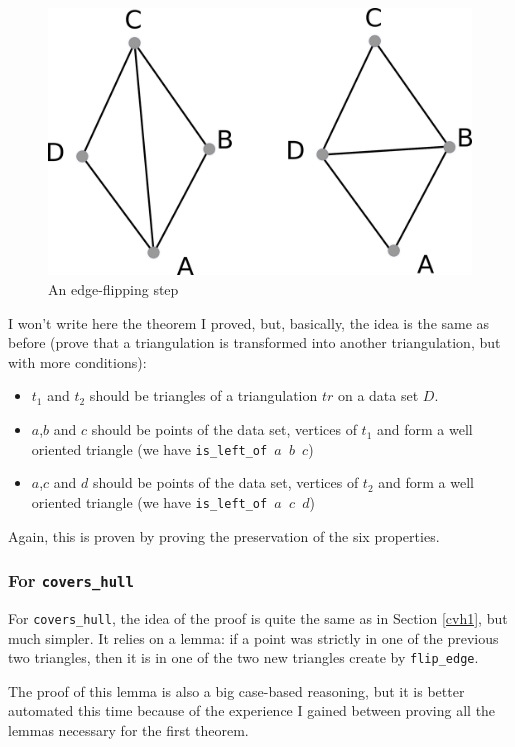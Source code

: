 \documentclass[a4paper,10pt]{article}
\begin{document}
\begin{figure}
  \centering
  \includegraphics[scale=2]{flip_edge}
    \caption{\label{flip_edge} An edge-flipping step}
\end{figure}

I won't write here the theorem I proved, but, basically, the idea is the same as before (prove that a triangulation is transformed into another triangulation, but with more conditions):
\begin{itemize}
\item $t_1$ and $t_2$ should be triangles of a triangulation $tr$ on a data set $D$.  
\item $a$,$b$ and $c$ should be points of the data set, vertices of $t_1$ and form a well oriented triangle (we have {\tt is\_left\_of $a$ $b$ $c$})
\item $a$,$c$ and $d$ should be points of the data set, vertices of $t_2$ and form a well oriented triangle (we have {\tt is\_left\_of $a$ $c$ $d$})
\end{itemize}
Again, this is proven by proving the preservation of the six properties.

\subsubsection{For {\tt covers\_hull}} 

For {\tt covers\_hull}, the idea of the proof is quite the same as in Section \ref{cvh1}, but much simpler.
It relies on a lemma: if a point was strictly in one of the previous two triangles, then it is in one of the two new triangles create by {\tt flip\_edge}.

The proof of this lemma is also a big case-based reasoning, but it is better automated this time because of the experience I gained between proving all the lemmas necessary for the first theorem.
\end{document}
